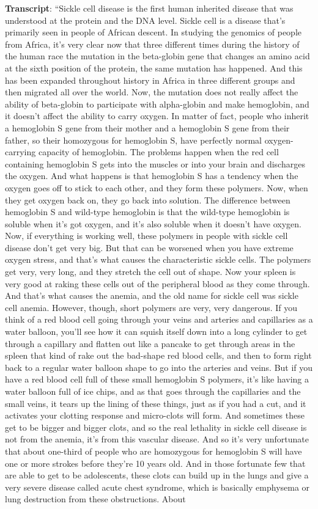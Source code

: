 \documentclass[
]{book}
\begin{document}
\textbf{Transcript}: ``Sickle cell disease is the first human inherited disease that was understood at the protein and the DNA level. Sickle cell is a disease that's primarily seen in people of African descent. In studying the genomics of people from Africa, it's very clear now that three different times during the history of the human race the mutation in the beta-globin gene that changes an amino acid at the sixth position of the protein, the same mutation has happened. And this has been expanded throughout history in Africa in three different groups and then migrated all over the world. Now, the mutation does not really affect the ability of beta-globin to participate with alpha-globin and make hemoglobin, and it doesn't affect the ability to carry oxygen. In matter of fact, people who inherit a hemoglobin S gene from their mother and a hemoglobin S gene from their father, so their homozygous for hemoglobin S, have perfectly normal oxygen-carrying capacity of hemoglobin. The problems happen when the red cell containing hemoglobin S gets into the muscles or into your brain and discharges the oxygen. And what happens is that hemoglobin S has a tendency when the oxygen goes off to stick to each other, and they form these polymers. Now, when they get oxygen back on, they go back into solution. The difference between hemoglobin S and wild-type hemoglobin is that the wild-type hemoglobin is soluble when it's got oxygen, and it's also soluble when it doesn't have oxygen. Now, if everything is working well, these polymers in people with sickle cell disease don't get very big. But that can be worsened when you have extreme oxygen stress, and that's what causes the characteristic sickle cells. The polymers get very, very long, and they stretch the cell out of shape. Now your spleen is very good at raking these cells out of the peripheral blood as they come through. And that's what causes the anemia, and the old name for sickle cell was sickle cell anemia. However, though, short polymers are very, very dangerous. If you think of a red blood cell going through your veins and arteries and capillaries as a water balloon, you'll see how it can squish itself down into a long cylinder to get through a capillary and flatten out like a pancake to get through areas in the spleen that kind of rake out the bad-shape red blood cells, and then to form right back to a regular water balloon shape to go into the arteries and veins. But if you have a red blood cell full of these small hemoglobin S polymers, it's like having a water balloon full of ice chips, and as that goes through the capillaries and the small veins, it tears up the lining of these things, just as if you had a cut, and it activates your clotting response and micro-clots will form. And sometimes these get to be bigger and bigger clots, and so the real lethality in sickle cell disease is not from the anemia, it's from this vascular disease. And so it's very unfortunate that about one-third of people who are homozygous for hemoglobin S will have one or more strokes before they're 10 years old. And in those fortunate few that are able to get to be adolescents, these clots can build up in the lungs and give a very severe disease called acute chest syndrome, which is basically emphysema or lung destruction from these obstructions. About 
\end{document}
